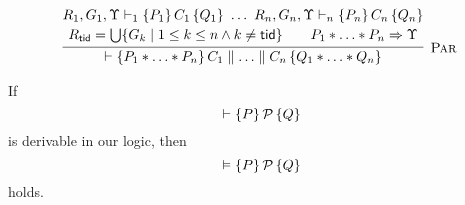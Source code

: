 \[
\begin{array}{@{}r@{}}
\infer[\textsc{Par}]{
 \vdash \{P_1 * \ldots * P_n\}\,C_1 \parallel \ldots \parallel C_n\,\{Q_1 * \ldots * Q_n\}
}{
\begin{array}{@{}c@{}}
R_1,G_1,\Upsilon  \vdash_1 \{P_1\}\,C_1\,\{Q_1\} \ 
\ldots\ 
R_n,G_n,\Upsilon  \vdash_n \{P_n\}\,C_n\,\{Q_n\}\\[2pt]
R_\ltid = \bigcup\{G_k \mid 1\leq k \leq n \land  k\neq \ltid\}
\qquad
P_1 * \ldots * P_n \Rightarrow \Upsilon
\end{array}
}
\end{array}
\]

\begin{theorem}
  If 
  $$
  {} \vdash \{ P \} \, \mathcal{P} \, \{ Q \}
  $$  
  is derivable in our logic, then
  $$  
  {} \vDash \{ P \} \, \mathcal{P} \, \{ Q \}
  $$ 
  holds.
\end{theorem}
